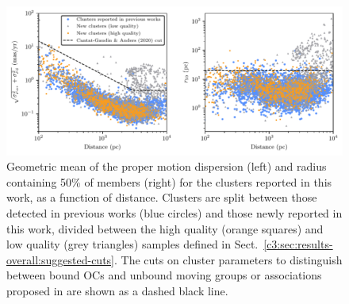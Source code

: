 \begin{figure}[t]
   \centering
   \includegraphics[width=\textwidth]{fig/c3/fig_results_tcg_cut.pdf}
   \caption[Geometric mean of the proper motion dispersion and radius containing 50\% of members for the clusters reported in this work]{Geometric mean of the proper motion dispersion (left) and radius containing 50\% of members (right) for the clusters reported in this work, as a function of distance. Clusters are split between those detected in previous works (blue circles) and those newly reported in this work, divided between the high quality (orange squares) and low quality (grey triangles) samples defined in Sect.~\ref{c3:sec:results-overall:suggested-cuts}. The cuts on cluster parameters to distinguish between bound OCs and unbound moving groups or associations proposed in \cite{cantat-gaudin_clusters_2020} are shown as a dashed black line.}%
   \label{c3:fig:tcg_cut_comparison}
\end{figure}

